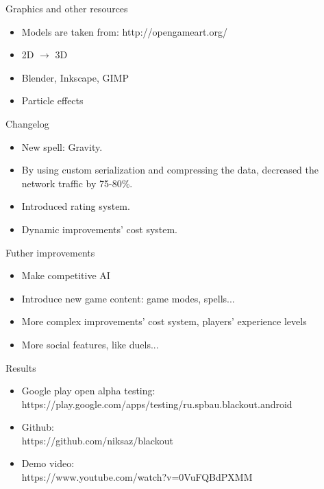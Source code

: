 \documentclass[12pt]{beamer}
\begin{document}
\begin{frame}{Graphics and other resources}
    \begin{itemize}
        \item <1-> Models are taken from: http://opengameart.org/
        \item <2-> 2D $\rightarrow$ 3D
        \item <3-> Blender, Inkscape, GIMP
        \item <4-> Particle effects
    \end{itemize}
\end{frame}


\begin{frame}{Changelog}
    \begin{itemize}
        \item New spell: Gravity.
        \item By using custom serialization and compressing the data, decreased the network traffic by 75-80\%.
        \item Introduced rating system.
        \item Dynamic improvements' cost system.
    \end{itemize}
\end{frame}


\begin{frame}{Futher improvements}
    \begin{itemize}
        \item <1-> Make competitive AI
        \item <2-> Introduce new game content: game modes, spells...
        \item <3-> More complex improvements' cost system, players' experience levels
        \item <4-> More social features, like duels...
    \end{itemize}
\end{frame}


\begin{frame}{Results}
    \begin{itemize}
        \item Google play open alpha testing: \\ https://play.google.com/apps/testing/ru.spbau.blackout.android
        \item Github: \\
        https://github.com/niksaz/blackout
        \item Demo video: \\
        https://www.youtube.com/watch?v=0VuFQBdPXMM
    \end{itemize}

\end{frame}
\end{document}
